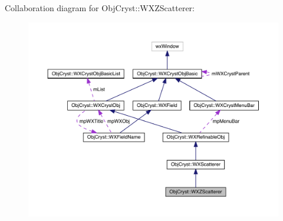 Collaboration diagram for Obj\+Cryst\+::W\+X\+Z\+Scatterer\+:
\nopagebreak
\begin{figure}[H]
\begin{center}
\leavevmode
\includegraphics[width=350pt]{class_obj_cryst_1_1_w_x_z_scatterer__coll__graph}
\end{center}
\end{figure}
